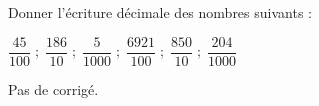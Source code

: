 \begin{exercice*}
    Donner l'écriture décimale des nombres suivants :
    \begin{center}
       $\dfrac{45}{100} \; ; \; \dfrac{186}{10} \; ; \; \dfrac{5}{\num{1 000}} \; ; \; \dfrac{\num{6 921}}{100} \; ; \; \dfrac{850}{10} \; ; \; \dfrac{204}{\num{1 000}}$
    \end{center}
 \end{exercice*}
\begin{corrige}
  Pas de corrigé.
\end{corrige}